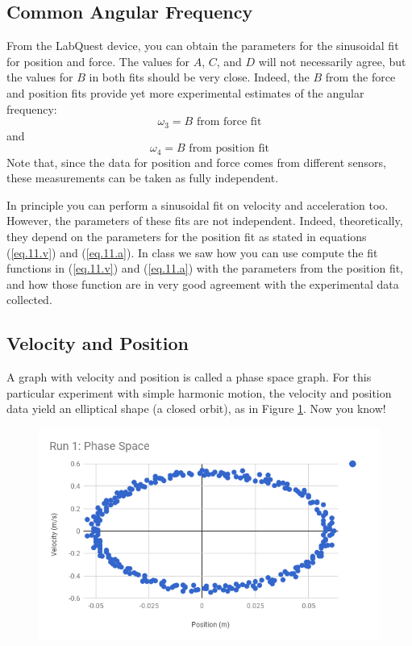 \subsection{Common Angular Frequency}
From the LabQuest device, you can obtain the parameters for the sinusoidal fit for position and force. The values for $A$, $C$, and $D$ will not necessarily agree, but the values for $B$ in both fits should be very close. Indeed, the $B$ from the force and position fits provide yet more experimental estimates of the angular frequency:
\begin{equation}
    \omega_{3} = B \text{ from force fit}
\end{equation}
and
\begin{equation}
    \omega_{4} = B \text{ from position fit}
\end{equation}
Note that, since the data for position and force comes from different sensors, these measurements can be taken as fully independent.

In principle you can perform a sinusoidal fit on velocity and acceleration too. However, the parameters of these fits are not independent. Indeed, theoretically, they depend on the parameters for the position fit as stated in equations (\ref{eq.11.v}) and (\ref{eq.11.a}). In class we saw how you can use compute the fit functions in (\ref{eq.11.v}) and (\ref{eq.11.a}) with the parameters from the position fit, and how those function are in very good agreement with the experimental data collected.
\subsection{Velocity and Position}
A graph with velocity and position is called a phase space graph. For this particular experiment with simple harmonic motion, the velocity and position data yield an elliptical shape (a closed orbit), as in Figure \ref{figure.11.phase}. Now you know!
\begin{figure} \label{figure.11.phase}
    \centering
    \includegraphics[scale=0.71]{image/11-shm/phase.png}
    \caption{}
\end{figure}
